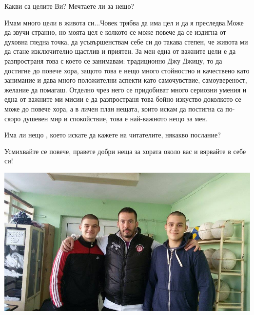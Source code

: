 \begin{multicols}{3}
Какви са целите Ви? Мечтаете ли за нещо?

Имам много цели в живота си...Човек трябва да има цел и да я преследва.Може да звучи  странно, но моята цел е колкото се може повече да се издигна от духовна гледна точка, да усъвършенствам себе си  до такава степен, че живота ми да стане изключително щастлив и приятен. За мен една от важните цели е да разпространя това с което се занимавам: традиционно Джу Джицу, то да достигне до повече хора, защото това е нещо много  стойностно  и качествено като занимание и дава много положителни аспекти като самочувствие, самоувереност, желание да помагаш. Отделно чрез него се придобиват  много сериозни умения  и  една от важните  ми мисии е да разпространя това бойно изкуство  доколкото се може до повече хора, а в личен план нещата, които искам да постигна  са по-скоро душевен мир и спокойствие,  това е най-важното нещо за мен.

Има ли нещо , което искате да кажете на читателите, някакво послание?

Усмихвайте се повече, правете добри неща за хората около вас и вярвайте в себе си! 
\end{multicols}

\begin{center}
\includegraphics[width=5.7in]{./Aslan/Aslan.jpg}
\end{center}

 
\closearticle


